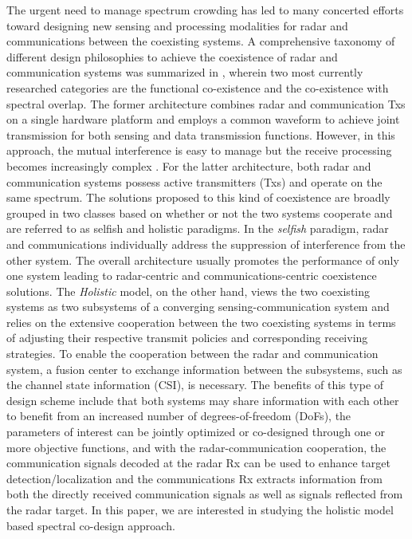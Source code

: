 \documentclass[9pt,journal]{IEEEtran}
\begin{document}
The urgent need to manage spectrum crowding has led to many concerted efforts toward designing new sensing and processing modalities for radar and communications between the coexisting systems\cite{mishra2019toward,zheng2019overiview,chiriyath2017radar}. A comprehensive taxonomy of different design philosophies to achieve the coexistence of radar and communication systems was summarized in \cite{zheng2019overiview}, wherein two most currently researched categories are the functional co-existence and the co-existence with spectral overlap. The former architecture combines radar and communication Txs on a single hardware platform and employs a common waveform to achieve joint transmission for both sensing and data transmission functions\cite{liu2018mu,liu2018toward,duggal2019doppler}. However, in this approach, the mutual interference is easy to manage but the receive processing becomes increasingly complex \cite{dokhanchi2019mmwave}. For the latter architecture, both radar and communication systems possess active transmitters (Txs) and operate on the same spectrum. The solutions proposed to this kind of coexistence are broadly grouped in two classes based on whether or not the two systems cooperate and are referred to as selfish and holistic paradigms. In the \textit{selfish} paradigm, radar and communications individually address the suppression of interference from the other system. The overall architecture usually promotes the performance of only one system leading to radar-centric \cite{alaee2019discrete,bao2019precoding,slavik2019cognitive} and communications-centric \cite{ayyar2019robust} coexistence solutions. The \textit{Holistic} model, on the other hand, views the two coexisting systems as two subsystems of a converging sensing-communication system and relies on the extensive cooperation between the two coexisting systems in terms of adjusting their respective transmit policies and corresponding receiving strategies\cite{mahal2017spectral,MCMIMO_RadComm,qian2018joint,rihan2018optimum,2019arXiv190707943G,biswas2018fdqos,he2019performance}. To enable the cooperation between the radar and communication system, a fusion center to exchange information between the subsystems, such as the channel state information (CSI), is necessary\cite{MCMIMO_RadComm,he2019performance}.
The benefits of this type of design scheme include that both systems may share information with each other to benefit from an increased number of degrees-of-freedom (DoFs), the parameters of interest can be jointly optimized or co-designed through one \cite{MCMIMO_RadComm,qian2018joint} or more \cite{biswas2018fdqos} objective functions, and with the radar-communication cooperation, the communication signals decoded at the radar Rx can be used to enhance target detection/localization\cite{biswas2018fdqos,he2019performance} and the communications Rx extracts information from both the directly received communication signals as well as signals reflected from the radar target\cite{liu2018mimo}. In this paper, we are interested in studying the holistic model based spectral co-design approach. 
\end{document}
